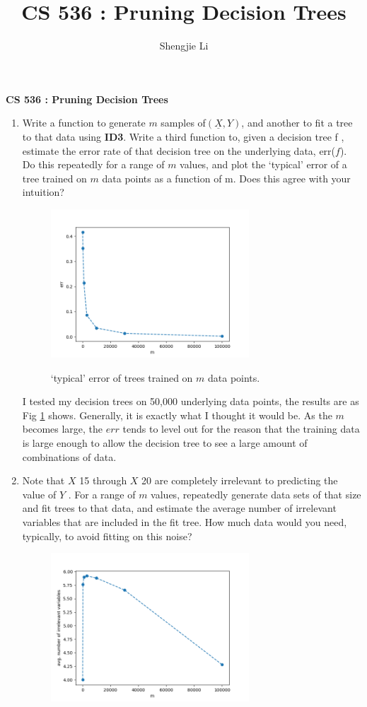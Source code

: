 \documentclass[letter, 12pt]{article}
\author{Shengjie Li}
\title{CS 536 : Pruning Decision Trees}
\begin{document}
    \centerline{\textbf{CS 536 : Pruning Decision Trees}}
    \begin{enumerate}
        \item {Write a function to generate $ m $ samples of$  (\underline{X}, Y) $, and another to fit a tree to that data using \textbf{ID3}. Write a
        	third function to, given a decision tree f , estimate the error rate of that decision tree on the underlying data,
        	err($ f $). Do this repeatedly for a range of $ m $ values, and plot the `typical' error of a tree trained on $ m $ data
        	points as a function of m. Does this agree with your intuition?}
        \begin{figure}[H]
        	\centering
        	\includegraphics[width=0.7\textwidth]{q1.png}
        	\label{q1}
        	\caption{`typical' error of trees trained on $ m $ data
        		points.}
        \end{figure}
    	\par{I tested my decision trees on 50,000 underlying data points, the results are as Fig \ref{q1} shows. Generally, it is exactly what I thought it would be. As the $ m $ becomes large, the $ err $ tends to level out for the reason that the training data is large enough to allow the decision tree to see a large amount of combinations of data.}
        \item{Note that $ X $ 15 through $ X $ 20 are completely irrelevant to predicting the value of $ Y $ . For a range of $ m $ values,
        	repeatedly generate data sets of that size and fit trees to that data, and estimate the average number of
        	irrelevant variables that are included in the fit tree. How much data would you need, typically, to avoid fitting
        	on this noise?}
        \begin{figure}[H]
	        \centering
	        \includegraphics[width=0.7\textwidth]{q2.png}

\end{figure}
\end{enumerate}
\end{document}
